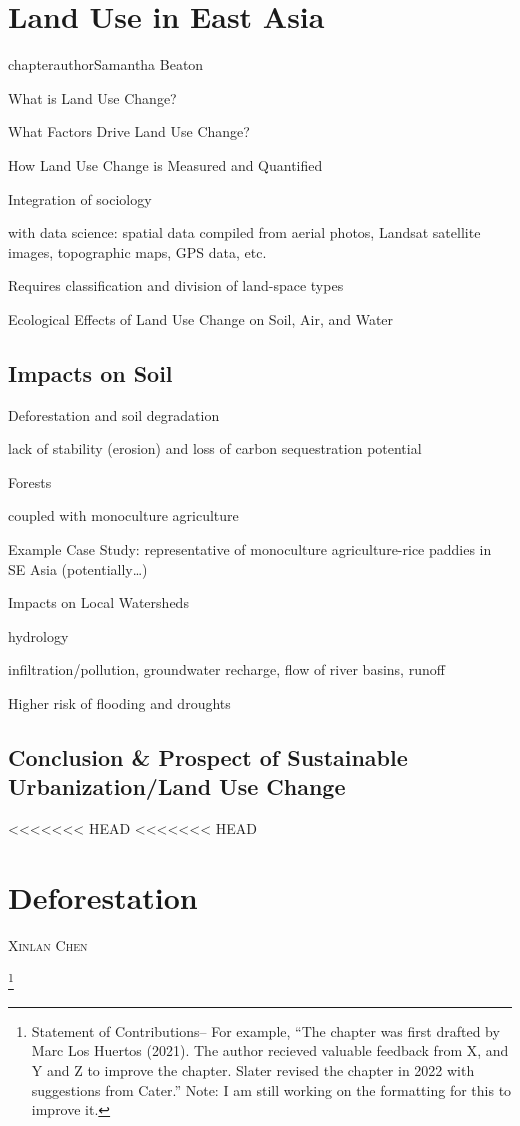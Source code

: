 \documentclass{book}\usepackage{knitr}
\makeatletter
\newcommand{\chapterauthor}[1]{%
  {\parindent0pt\vspace*{-25pt}%
  \linespread{1.1}\large\scshape#1%
  \par\nobreak\vspace*{35pt}}
  \@afterheading%
}
\makeatother
\begin{document}
\begin{knitrout}
\begin{kframe}
\chapter{Land Use in East Asia}

chapterauthor{Samantha Beaton}

What is Land Use Change?

What Factors Drive Land Use Change?

How Land Use Change is Measured and Quantified

Integration of sociology

with data science: spatial data compiled from aerial photos, Landsat satellite images, topographic maps, GPS data, etc.

Requires classification and division of land-space types

Ecological Effects of Land Use Change on Soil, Air, and Water

\section{Impacts on Soil}

Deforestation and soil degradation

lack of stability (erosion) and loss of carbon sequestration potential

Forests


coupled with monoculture agriculture

Example Case Study: representative of monoculture agriculture-rice paddies in SE Asia (potentially\ldots)


Impacts on Local Watersheds

hydrology 

infiltration/pollution, groundwater recharge, flow of river basins, runoff

Higher risk of flooding and droughts

\section{Conclusion \& Prospect of Sustainable Urbanization/Land Use Change}


<<<<<<< HEAD
<<<<<<< HEAD
\chapter{Deforestation}\label{ch:deforestation}

\chapterauthor{Xinlan Chen}

\footnote{Statement of Contributions-- For example, ``The chapter was first drafted by Marc Los Huertos (2021). The author recieved valuable feedback from X, and Y and Z to improve the chapter. Slater revised the chapter in 2022 with suggestions from Cater.'' Note: I am still working on the formatting for this to improve it.}


\end{kframe}
\end{knitrout}
\end{document}
